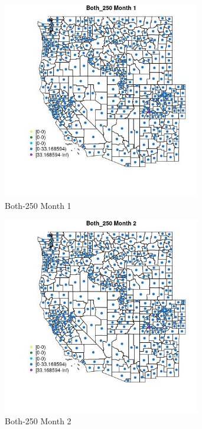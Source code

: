 \begin{figure} 
\centering  
\includegraphics[width=0.77\textwidth]{Code_Outputs/df_report_ML_predictors_CountyCentroid_Locations_Dates_2008-01-01to2018-12-31_MapObsMo1Both_250.jpg} 
\caption{\label{fig:df_report_ML_predictors_CountyCentroid_Locations_Dates_2008-01-01to2018-12-31MapObsMo1Both_250}Both-250 Month 1} 
\end{figure} 
 

\clearpage 

\begin{figure} 
\centering  
\includegraphics[width=0.77\textwidth]{Code_Outputs/df_report_ML_predictors_CountyCentroid_Locations_Dates_2008-01-01to2018-12-31_MapObsMo2Both_250.jpg} 
\caption{\label{fig:df_report_ML_predictors_CountyCentroid_Locations_Dates_2008-01-01to2018-12-31MapObsMo2Both_250}Both-250 Month 2} 
\end{figure} 
 

